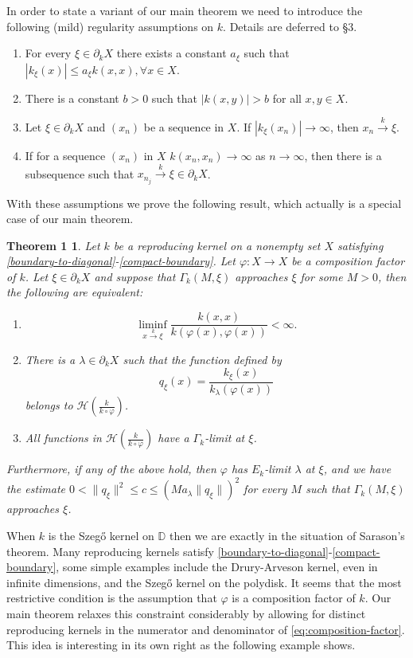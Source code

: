 \documentclass[leqno, final]{article}
\newtheorem*{theorem1}{Theorem 1} %
\theoremstyle{definition}
\newcommand{\xto}[1]{\stackrel{#1}{\to}}
\newcommand{\disk}{\mathbb{D}}
\newcommand{\Hilbert}{\mathcal{H}}
\newcommand{\rand}{\partial}
\renewcommand{\phi}{\varphi}
\begin{document}
In order to state a variant of our main theorem we need to introduce the following (mild)
regularity assumptions on $k$. Details are deferred to \S3.
\begin{enumerate}[label=(\Alph*)]
\item\label{boundary-to-diagonal}
For every $\xi\in\rand_kX$ there exists a constant $a_\xi$ such that
$|k_\xi(x)| \leq a_\xi k(x,x), \forall x\in X.$
\item\label{constants-inclusion}
There is a constant $b>0$ such that $|k(x,y)|>b$ for all $x,y\in X$.
\item\label{isolated-singularity}
Let $\xi\in\rand_kX$ and $(x_n)$ be a sequence in $X$. If $|k_\xi(x_n)|\to\infty$,
then $x_n\xto{k}\xi$.
\item\label{compact-boundary}
If for a sequence $(x_n)$ in $X$ $k(x_n,x_n)\to\infty$ as $n\to\infty$,
then there is a subsequence such that $x_{n_j}\xto{k}\xi\in\rand_kX$.
\end{enumerate}
With these assumptions we prove the following result, which actually is a special
case of our main theorem.
\begin{theorem1}
Let $k$ be a reproducing kernel on a nonempty set $X$ satisfying
\ref{boundary-to-diagonal}-\ref{compact-boundary}.
Let $\phi:X\to X$ be a composition factor of $k$.
Let $\xi\in\partial_kX$ and
suppose that $\Gamma_k(M,\xi)$ approaches $\xi$ for some $M>0$, then the
following are equivalent:
\begin{enumerate}[label=(\roman*)]
\item \[
	\liminf_{x\xto{k}\xi} \frac{k(x,x)}{k(\phi(x),\phi(x))} < \infty.
\]
\item There is a $\lambda\in\partial_kX$ such that the function defined by \[
	q_\xi(x) = \frac{k_\xi(x)}{k_\lambda(\phi(x))}
\]
belongs to $\Hilbert(\frac{k}{k\circ\phi})$.
\item All functions in $\Hilbert(\frac{k}{k\circ\phi})$ have a $\Gamma_k$-limit at $\xi$.
\end{enumerate}
Furthermore, if any of the above hold, then $\phi$ has $E_k$-limit $\lambda$ at $\xi$, and
we have the estimate $0<\|q_\xi\|^2\leq c\leq (Ma_\lambda\|q_\xi\|)^2$ for every $M$ such that
$\Gamma_k(M,\xi)$ approaches $\xi$.
\end{theorem1}
\noindent When $k$ is the Szeg\H{o} kernel on $\disk$ then we are exactly in the situation of Sarason's
theorem.
Many reproducing kernels satisfy \ref{boundary-to-diagonal}-\ref{compact-boundary},
some simple examples include the Drury-Arveson kernel, even in infinite dimensions,
and the Szeg\H{o} kernel on the polydisk. It seems that the most restrictive condition is
the assumption that $\phi$ is a composition factor of $k$. Our main theorem relaxes
this constraint considerably by allowing for distinct reproducing kernels in the numerator and
denominator of \eqref{eq:composition-factor}. This idea is interesting in its own right
as the following example shows.
\end{document}
